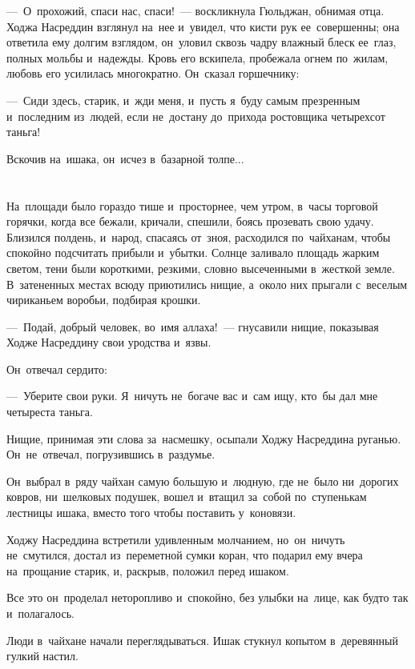 \documentclass[12pt,a4paper]{book}
\begin{document}
—~О~прохожий, спаси нас, спаси!~— воскликнула Гюльджан, обнимая отца. Ходжа Насреддин взглянул на~нее и~увидел, что кисти рук ее~совершенны; она ответила ему долгим взглядом, он~уловил сквозь чадру влажный блеск ее~глаз, полных мольбы и~надежды. Кровь его вскипела, пробежала огнем по~жилам, любовь его усилилась многократно. Он~сказал горшечнику:

—~Сиди здесь, старик, и~жди меня, и~пусть я~буду самым презренным и~последним из~людей, если не~достану до~прихода ростовщика четырехсот таньга!

Вскочив на~ишака, он~исчез в~базарной толпе...


\chapter{}

На~площади было гораздо тише и~просторнее, чем утром, в~часы торговой горячки, когда все бежали, кричали, спешили, боясь прозевать свою удачу. Близился полдень, и~народ, спасаясь от~зноя, расходился по~чайханам, чтобы спокойно подсчитать прибыли и~убытки. Солнце заливало площадь жарким светом, тени были короткими, резкими, словно высеченными в~жесткой земле. В~затененных местах всюду приютились нищие, а~около них прыгали с~веселым чириканьем воробьи, подбирая крошки.

—~Подай, добрый человек, во~имя аллаха!~— гнусавили нищие, показывая Ходже Насреддину свои уродства и~язвы.

Он~отвечал сердито:

—~Уберите свои руки. Я~ничуть не~богаче вас и~сам ищу, кто~бы дал мне четыреста таньга.

Нищие, принимая эти слова за~насмешку, осыпали Ходжу Насреддина руганью. Он~не~отвечал, погрузившись в~раздумье.

Он~выбрал в~ряду чайхан самую большую и~людную, где не~было ни~дорогих ковров, ни~шелковых подушек, вошел и~втащил за~собой по~ступенькам лестницы ишака, вместо того чтобы поставить у~коновязи.

Ходжу Насреддина встретили удивленным молчанием, но~он~ничуть не~смутился, достал из~переметной сумки коран, что подарил ему вчера на~прощание старик, и, раскрыв, положил перед ишаком.

Все это он~проделал неторопливо и~спокойно, без улыбки на~лице, как будто так и~полагалось.

Люди в~чайхане начали переглядываться. Ишак стукнул копытом в~деревянный гулкий настил.
\end{document}
